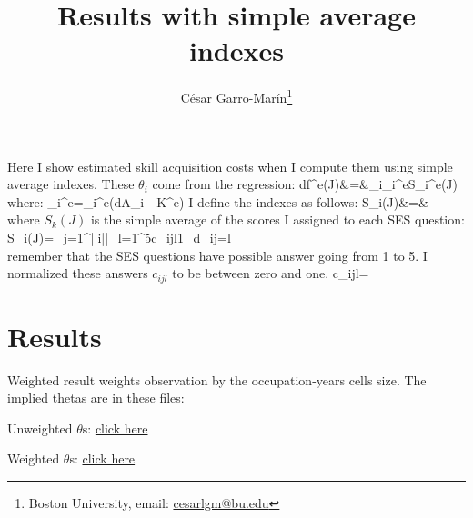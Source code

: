 \documentclass[a4paper, 12pt]{article}
\title{Results with simple average indexes}
\author{C\'esar Garro-Mar\'in\thanks{Boston University, email: \href{mailto:cesarlgm@bu.edu}{cesarlgm@bu.edu}}}
\begin{document}
	\maketitle
	
	\newcommand{\ntimes}{4 }
	
	Here I show estimated skill acquisition costs when I compute them using simple average indexes. These $\theta_i$ come from the regression:
	\beqn
	d\ln f^e(J)&=&\sum_i\beta_i^eS_i^e(J)\\
	\eeqn
	where:
	\beqns
		\beta_{i}^e=\theta_i^e(d\ln A_i - K^e)
	\eeqns
	I define the indexes as follows:
	\beqns
		S_i(J)&=& \\
	\eeqns
	where $S_k(J)$ is the simple average of the scores I assigned to each SES question:
	\beqns
		S_{i}(J)=\sum_{j=1}^{||i||}\sum_{l=1}^5c_{ijl}1_{d_{ij}=l}\\
	\eeqns
	remember that the SES questions have possible answer going from 1 to 5. I normalized these answers $c_{ijl}$  to be between zero and one.
	\beqns
		c_{ijl}=
	\eeqns
	\section{Results}
	Weighted result weights observation by the occupation-years cells size. The implied thetas are in these files:
	\bitem
		\item Unweighted $\theta$s: \href{URL}{click here}
		\item Weighted $\theta$s: \href{URL}{click here}
	\eitem
	\FloatBarrier
	
	\FloatBarrier
	
\end{document}
